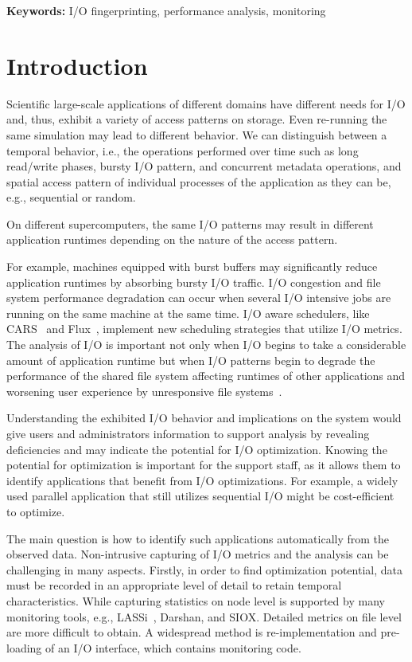\documentclass{jhps}
\begin{document}
\textbf{Keywords: }I/O fingerprinting, performance analysis, monitoring

\section{Introduction}
Scientific large-scale applications of different domains have different needs for I/O and, thus, exhibit a variety of access patterns on storage.
Even re-running the same simulation may lead to different behavior.
We can distinguish between a temporal behavior, i.e., the operations performed over time such as long read/write phases, bursty I/O pattern, and concurrent metadata operations, and spatial access pattern of individual processes of the application as they can be, e.g., sequential or random.

On different supercomputers, the same I/O patterns may result in different application runtimes depending on the nature of the access pattern.

For example, machines equipped with burst buffers \cite{10.1007/978-3-030-02465-9_9, 7004215} may significantly reduce application runtimes by absorbing bursty I/O traffic.
I/O congestion and file system performance degradation can occur when several I/O intensive jobs are running on the same machine at the same time.
I/O aware schedulers, like CARS~\cite{LIANG201925} and Flux~\cite{flux}, implement new scheduling strategies that utilize I/O metrics.
The analysis of I/O is important not only when I/O begins to take a considerable amount of application runtime but when I/O patterns begin to degrade the performance of the shared file system affecting runtimes of other applications and worsening user experience by unresponsive file systems~\cite{10.1007/978-3-030-02465-9_5}.

Understanding the exhibited I/O behavior and implications on the system would give users and administrators information to support analysis by revealing deficiencies and may indicate the potential for I/O optimization.
Knowing the potential for optimization is important for the support staff, as it allows them to identify applications that benefit from I/O optimizations.
For example, a widely used parallel application that still utilizes sequential I/O might be cost-efficient to optimize.

The main question is how to identify such applications automatically from the observed data.
Non-intrusive capturing of I/O metrics and the analysis can be challenging in many aspects.
Firstly, in order to find optimization potential, data must be recorded in an appropriate level of detail to retain temporal characteristics.
While capturing statistics on node level is supported by many monitoring tools, e.g., LASSi~\cite{sivalingam2019lassi}, Darshan\cite{hpcdarshan}, and SIOX\cite{TSACAMAOOP14}.
Detailed metrics on file level are more difficult to obtain.
A widespread method is re-implementation and pre-loading of an I/O interface, which contains monitoring code.
\end{document}
